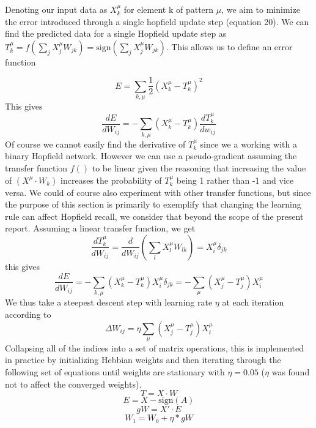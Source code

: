 \documentclass{article}
\begin{document}
Denoting our input data as $X_{k}^\mu$ for element k of pattern $\mu$, we aim to minimize the error introduced through a single hopfield update step (equation 20). We can find the predicted data for a single Hopfield update step as $T_k^\mu = f(\sum_j{X_j^\mu W_{jk}})=\text{sign}(\sum_j{X_j^\mu W_{jk}})$. This allows us to define an error function

\begin{equation}
E =\sum_{k, \mu}{\dfrac{1}{2}(X_{k}^\mu-T_k^\mu)^2}
\end{equation}
This gives
\begin{equation}
\dfrac{dE}{dW_{ij}} = - \sum_{k, \mu}{(X_{k}^\mu-T_k^\mu) \dfrac{dT_k^\mu}{dw_{ij}}}
\end{equation}
Of course we cannot easily find the derivative of $T_k^\mu$ since we a working with a binary Hopfield network. However we can use a pseudo-gradient assuming the transfer function $f()$ to be linear given the reasoning that increasing the value of $(X^\mu \cdot W_k)$ increases the probability of $T_k^\mu$ being 1 rather than -1 and vice versa. We could of course also experiment with other transfer functions, but since the purpose of this section is primarily to exemplify that changing the learning rule can affect Hopfield recall, we consider that beyond the scope of the present report. Assuming a linear transfer function, we get
\begin{equation}
\dfrac{dT_k^\mu}{dW_{ij}} = \dfrac{d}{dW_{ij}}(\sum_l{X_l^\mu W_{lk}}) = X_i^\mu \delta_{jk}
\end{equation}
this gives
\begin{equation}
\dfrac{dE}{dW_{ij}} = - \sum_{k, \mu}{(X_{k}^\mu-T_k^\mu) X_i^\mu \delta_{jk}} =-  \sum_{\mu}{(X_{j}^\mu-T_j^\mu) X_i^\mu}
\end{equation}
We thus take a steepest descent step with learning rate $\eta$ at each iteration according to
\begin{equation}
\Delta W_{ij} =\eta \sum_{\mu}{(X_{j}^\mu-T_j^\mu) X_i^\mu}
\end{equation}
Collapsing all of the indices into a set of matrix operations, this is implemented in practice by initializing Hebbian weights and then iterating through the following set of equations until weights are stationary with $\eta=0.05$ ($\eta$ was found not to affect the converged weights).
\begin{equation}
T = X \cdot W
\end{equation}
\begin{equation}
E = X - \text{sign}(A)
\end{equation}
\begin{equation}
gW = X' \cdot E
\end{equation}
\begin{equation}
W_1 = W_0 + \eta*gW 
\end{equation}
\end{document}
